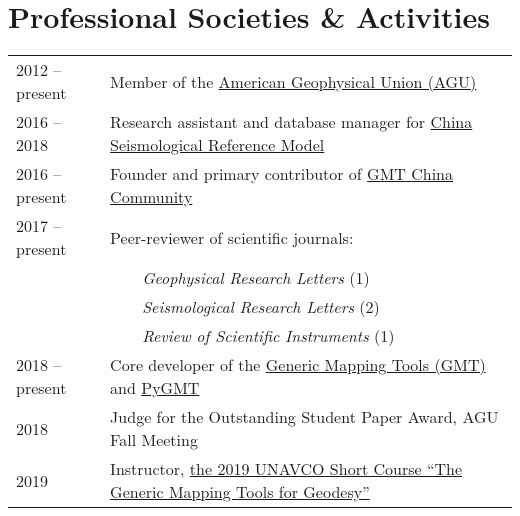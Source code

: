 \section*{Professional Societies \& Activities}

\newcommand{\tabitem}{~~\llap{\textbullet}~~}

\begin{tabular}{ll}
2012 -- present & Member of the \href{https://sites.agu.org/}{American Geophysical Union (AGU)} \\
2016 -- 2018    & Research assistant and database manager for \href{http://chinageorefmodel.org/}{China Seismological Reference Model} \\
2016 -- present & Founder and primary contributor of \href{http://gmt-china.org/}{GMT China Community} \\
2017 -- present & Peer-reviewer of scientific journals: \\
                & \tabitem \textit{Geophysical Research Letters} (1) \\
                & \tabitem \textit{Seismological Research Letters} (2) \\
                & \tabitem \textit{Review of Scientific Instruments} (1) \\
2018 -- present & Core developer of the \href{https://github.com/GenericMappingTools/gmt}{Generic Mapping Tools (GMT)} and \href{https://github.com/GenericMappingTools/pygmt}{PyGMT} \\
2018 & Judge for the Outstanding Student Paper Award, AGU Fall Meeting \\
2019 & Instructor, \href{https://www.unavco.org/education/professional-development/short-courses/2019/geodetic-gmt/geodetic-gmt.html}{the 2019 UNAVCO Short Course ``The Generic Mapping Tools for Geodesy''} \\
\end{tabular}
